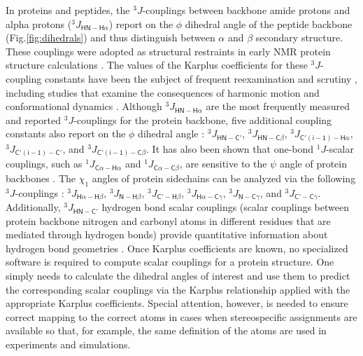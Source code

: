 \documentclass[9pt,review]{livecoms}
\begin{document}
In proteins and peptides, the $^3J$-couplings between backbone amide protons and alpha protons ($^3J_{\mathsf{HN-H\alpha}}$) report on the $\phi$ dihedral angle of the peptide backbone (Fig.\ref{fig:dihedrals}) and thus distinguish between $\alpha$ and $\beta$ secondary structure.
These couplings were adopted as structural restraints in early NMR protein structure calculations \cite{pardi_calibration_1984}.
The values of the Karplus coefficients for these $^3J$-coupling constants have been the subject of frequent reexamination and scrutiny \cite{case_static_2000,lindorff-larsen_interpreting_2005,altona_vicinal_2007,vogeli_limits_2007,wang_quantum_2013,lee_quantitative_2015,li_high_2015}, including studies that examine the consequences of harmonic motion and conformational dynamics \cite{brueschweiler_adding_1994,case_static_2000,lindorff-larsen_interpreting_2005,vogeli_limits_2007,lee_quantitative_2015}.
Although $^3J_{\mathsf{HN-H\alpha}}$ are the most frequently measured and reported $^3J$-couplings for the protein backbone, five additional coupling constants also report on the $\phi$ dihedral angle \cite{schmidt_self-consistent_1999}: $^3J_{\mathsf{HN-C'}}$, $^3J_{\mathsf{HN-C\beta}}$, $^3J_{\mathsf{C'(i-1)-H\alpha}}$, $^3J_{\mathsf{C'(i-1)-C'}}$, and $^3J_{\mathsf{C'(i-1)-C\beta}}$.
It has also been shown that one-bond $^1J$-scalar couplings, such as $^1J_{\mathsf{C\alpha-H\alpha}}$ and $^1J_{\mathsf{C\alpha-C\beta}}$, are sensitive to the $\psi$ angle of protein backbones \cite{vuister_use_1993,cornilescu_large_2000,gapsys_improved_2015}.
The $\chi_1$ angles of protein sidechains can be analyzed via the following $^3J$-couplings \cite{perez_self-consistent_2001,chou_insights_2003}: $^3J_{\mathsf{H\alpha-H\beta}}$, $^3J_{\mathsf{N-H\beta}}$, $^3J_{\mathsf{C'-H\beta}}$, $^3J_{\mathsf{H\alpha-C\gamma}}$, $^3J_{\mathsf{N-C\gamma}}$, and $^3J_{\mathsf{C'-C\gamma}}$.
Additionally, $^3J_{\mathsf{HN-C'}}$ hydrogen bond scalar couplings (scalar couplings between protein backbone nitrogen and carbonyl atoms in different residues that are mediated through hydrogen bonds) provide quantitative information about hydrogen bond geometries \cite{barfield_structural_2002}.
Once Karplus coefficients are known, no specialized software is required to compute scalar couplings for a protein structure.
One simply needs to calculate the dihedral angles of interest and use them to predict the corresponding scalar couplings via the Karplus relationship applied with the appropriate Karplus coefficients.
Special attention, however, is needed to ensure correct mapping to the correct atoms in cases when stereospecific assignments are available so that, for example, the same definition of the atoms are used in experiments and simulations.
\end{document}
